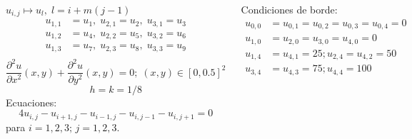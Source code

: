 \documentclass[9pt, aspectratio=169]{beamer}
\begin{document}
\begin{frame}
\begin{columns}
\cx
\begin{center}
\includegraphics[scale=1.1]{figs/malla-03.pdf}
\end{center}

$u_{i,j} \mapsto u_l,\; l = i + m (j -1) $
\begin{align*}
    u_{1,1} &= u_1,\; u_{2,1} = u_2,\; u_{3,1} = u_{3} \\
    u_{1,2} &= u_4,\; u_{2,2} = u_5,\; u_{3,2} = u_{6} \\
    u_{1,3} &= u_7,\; u_{2,3} = u_8,\; u_{3,3} = u_{9} \\
\end{align*}
\cx
\[ \frac{\partial^2 u}{\partial x^2}(x, y) + \frac{\partial^2 u}{\partial y^2}(x, y) = 0; \;(x, y) \in [0, 0.5]^2 \]
\[ h = k = 1/8 \] \pause
Ecuaciones:
\[ 4 u_{i,j} - u_{i+1, j} - u_{i-1,j} -u_{i,j-1} -u_{i, j+1} = 0 \]
para $i = 1, 2, 3; \, j = 1, 2, 3$. \vspace{1em} \pause

Condiciones de borde:
\begin{align*}
    u_{0,0} &= u_{0,1} = u_{0,2} = u_{0,3} = u_{0, 4} = 0 \\
    u_{1,0} &= u_{2,0} = u_{3,0} = u_{4, 0} = 0 \\
    u_{1,4} &= u_{4,1} = 25; u_{2,4} = u_{4,2} = 50 \\
    u_{3,4} &= u_{4,3} = 75; u_{4,4} = 100
\end{align*}
\end{columns}
\end{frame}
\end{document}
